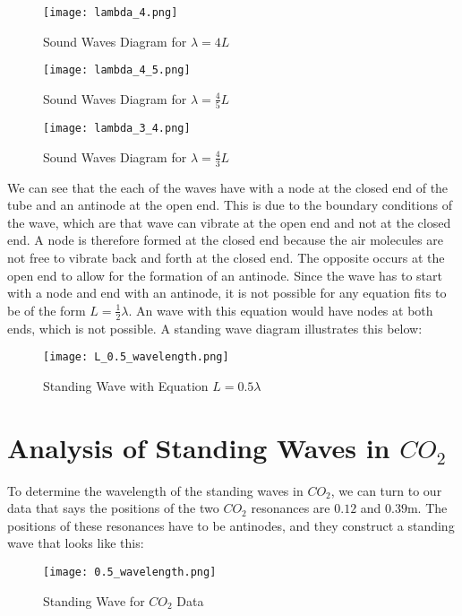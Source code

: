\documentclass[11pt,twoside]{article}
\begin{document}

\begin{figure}[H]
    \centering
    \texttt{[image: lambda\_4.png]}
    \caption{Sound Waves Diagram for $\lambda = 4L$}
    
    \texttt{[image: lambda\_4\_5.png]}
    \caption{Sound Waves Diagram for $\lambda = \frac{4}{5}L$}
    
    \texttt{[image: lambda\_3\_4.png]}
    \caption{Sound Waves Diagram for $\lambda = \frac{4}{3}L$}
\end{figure}

We can see that the each of the waves have with a node at the closed end of the tube and an antinode at the open end. This is due to the boundary conditions of the wave, which are that wave can vibrate at the open end and not at the closed end. A node is therefore formed at the closed end because the air molecules are not free to vibrate back and forth at the closed end. The opposite occurs at the open end to allow for the formation of an antinode. Since the wave has to start with a node and end with an antinode, it is not possible for any equation fits to be of the form $L = \frac{1}{2}\lambda$. An wave with this equation would have nodes at both ends, which is not possible. A standing wave diagram illustrates this below:

\begin{figure}[H]
    \centering
    \texttt{[image: L\_0.5\_wavelength.png]}
    \caption{Standing Wave with Equation $L = 0.5\lambda$}
\end{figure}

\section{Analysis of Standing Waves in $CO_2$}

To determine the wavelength of the standing waves in $CO_2$, we can turn to our data that says the positions of the two $CO_2$ resonances are $0.12$ and $0.39$m. The positions of these resonances have to be antinodes, and they construct a standing wave that looks like this:

\begin{figure}[H]
    \centering
    \texttt{[image: 0.5\_wavelength.png]}
    \caption{Standing Wave for $CO_2$ Data}
\end{figure}
\end{document}
